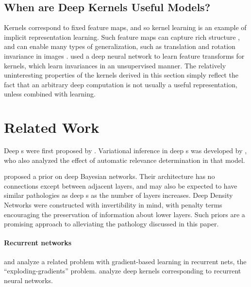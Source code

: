 \subsection{When are Deep Kernels Useful Models?}

Kernels correspond to fixed feature maps, and so kernel learning is an example of implicit representation learning. %
Such feature maps can capture rich structure \citep{DuvLloGroetal13}, and can enable many types of generalization, such as translation and rotation invariance in images \citep{kondor2008group}.
\cite{SalHin08} used a deep neural network to learn feature transforms for kernels, which learn invariances in an unsupervised manner.
The relatively uninteresting properties of the kernels derived in this section simply reflect the fact that an arbitrary deep computation is not usually a useful representation, unless combined with learning.






\section{Related Work}

Deep \gp{}s were first proposed by \cite{lawrence2007hierarchical}. Variational inference in deep \gp{}s was developed by \cite{damianou2012deep}, who also analyzed the effect of automatic relevance determination in that model.

\citet{adams2010learning} proposed a prior on deep Bayesian networks.  Their architecture has no connections except between adjacent layers, and may also be expected to have similar pathologies as deep \gp{}s as the number of layers increases.
%
Deep Density Networks \citep{rippel2013high} were constructed with invertibility in mind, with penalty terms encouraging the preservation of information about lower layers. Such priors are a promising approach to alleviating the pathology discussed in this paper.

\paragraph{Recurrent networks}
\cite{bengio1994learning} and \cite{pascanu2012understanding} analyze a related problem with gradient-based learning in recurrent nets, the ``exploding-gradients'' problem.
\cite{hermans2012recurrent} analyze deep kernels corresponding to recurrent neural networks.


